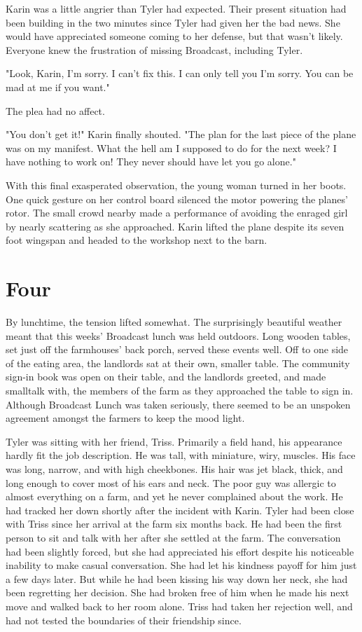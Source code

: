\documentclass[courier]{sffms}
\begin{document}
Karin was a little
angrier than Tyler had expected. Their present situation had
been building in the two minutes since Tyler had given her
the bad news. She would have appreciated someone coming 
to her defense, but that wasn't likely. Everyone knew the frustration
of missing Broadcast, including Tyler.

"Look, Karin, I'm sorry. I can't fix this. I can only tell you I'm sorry.
You can be mad at me if you want."

The plea had no affect.

"You don't get it!" Karin finally shouted. "The plan for the last piece of the plane was on my
manifest. What the hell am I supposed to do for the next week? I have
nothing to work on! They never should have let you go alone."

With this final exasperated observation, the young woman turned in
her boots. One quick gesture on her control board silenced the motor
powering the planes' rotor. The small crowd nearby made a performance
of avoiding the enraged girl by nearly scattering as she approached.
Karin lifted the plane despite its seven foot wingspan and headed to
the workshop next to the barn.


\chapter{Four}
By lunchtime, the tension lifted somewhat. The surprisingly beautiful
weather meant that this weeks' Broadcast lunch was held outdoors.
Long wooden tables, set just off the farmhouses' back porch, served
these events well. Off to one side of the eating area, the landlords 
sat at their own, smaller table. The community
sign-in book was open on their table, and the landlords greeted, and
made smalltalk with, the members of the farm as they approached the
table to sign in. Although Broadcast Lunch was taken seriously, there
seemed to be an unspoken agreement amongst the farmers to keep
the mood light.

Tyler was sitting with her friend, Triss. Primarily a field hand, his appearance
hardly fit the job description. He was tall, with miniature, wiry, muscles.
His face was long, narrow, and with high cheekbones. His hair was jet black,
thick, and long enough to cover most of his ears and neck. The poor guy was
allergic to almost everything on a farm, and yet he never complained about
the work. He had tracked her down shortly
after the incident with Karin. Tyler had been close with Triss since her arrival
at the farm six months back. He had been the first person to sit and talk with
her after she settled at the farm. The conversation had been slightly
forced, but she had appreciated his effort despite his noticeable inability
to make casual conversation. She had let his kindness payoff for him just a few days
later. But while he had been kissing his way down her neck, she had been regretting
her decision. She had broken free of him when he made his next move
and walked back to her room alone. Triss had
taken her rejection well, and had not tested the boundaries of their friendship since.
\end{document}

